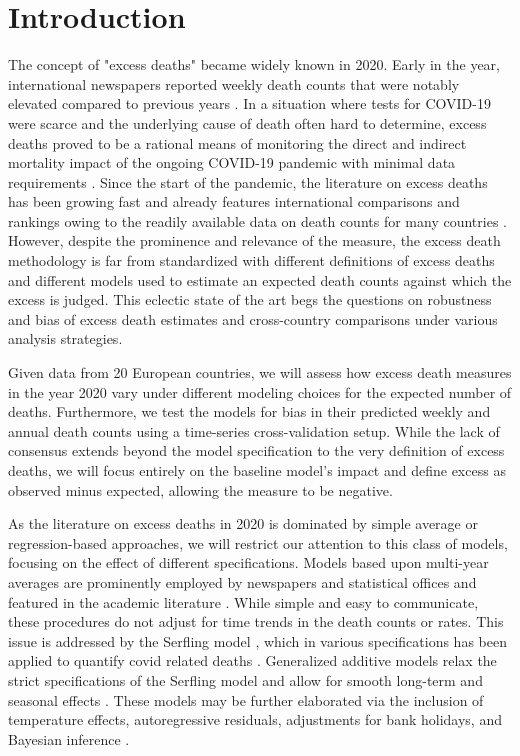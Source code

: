 \documentclass[12pt]{article}
\begin{document}

\section*{Introduction}

The concept of "excess deaths" became widely known in 2020. Early in the year, international newspapers reported weekly death counts that were notably elevated compared to previous years \citep{EDT2020, NYT2020}. In a situation where tests for COVID-19 were scarce and the underlying cause of death often hard to determine, excess deaths proved to be a rational means of monitoring the direct and indirect mortality impact of the ongoing COVID-19 pandemic with minimal data requirements \citep{Leon2020}.
Since the start of the pandemic, the literature on excess deaths has been growing fast and already features international comparisons and rankings owing to the readily available data on death counts for many countries \citep{Kontis2020, Arolas2021, Rizzi2021, Bilinski2020}.
However, despite the prominence and relevance of the measure, the excess death methodology is far from standardized with different definitions of excess deaths and different models used to estimate an expected death counts against which the excess is judged. This eclectic state of the art begs the questions on robustness and bias of excess death estimates and cross-country comparisons under various analysis strategies.

Given data from 20 European countries, we will assess how excess death measures in the year 2020 vary under different modeling choices for the expected number of deaths. Furthermore, we test the models for bias in their predicted weekly and annual death counts using a time-series cross-validation setup. While the lack of consensus extends beyond the model specification to the very definition of excess deaths, we will focus entirely on the baseline model's impact and define excess as observed minus expected, allowing the measure to be negative.

As the literature on excess deaths in 2020 is dominated by simple average or regression-based approaches, we will restrict our attention to this class of models, focusing on the effect of different specifications. Models based upon multi-year averages are prominently employed by newspapers and statistical offices and featured in the academic literature \citep{Campbell2021, Magnani2020, Michelozzi2020, Modig2020}. While simple and easy to communicate, these procedures do not adjust for time trends in the death counts or rates. This issue is addressed by the Serfling model \citep{Serfling1963}, which in various specifications has been applied to quantify covid related deaths
\citep{Barnard2020, Weinberger2020, Woolf2020, EuroMoMo2020, Arolas2021}.
Generalized additive models relax the strict specifications of the Serfling model and allow for smooth long-term and seasonal effects \citep{Aburto2021, Scortichini2020}. These models may be further elaborated via the inclusion of temperature effects, autoregressive residuals, adjustments for bank holidays, and Bayesian inference \citep{Kontis2020}.
\end{document}
